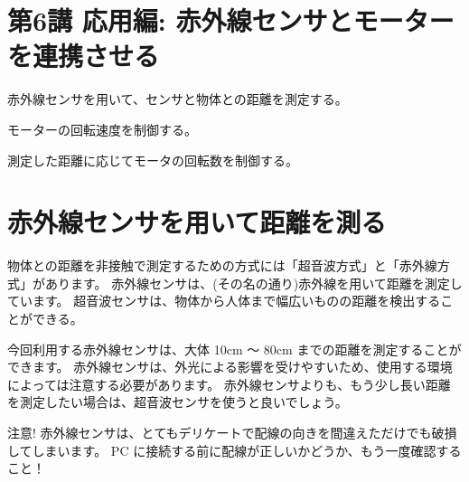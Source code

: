 \documentclass[11pt,a4paper]{jarticle}
\begin{document}
\section*{\LARGE{第6講 応用編: 赤外線センサとモーターを連携させる}}
赤外線センサを用いて、センサと物体との距離を測定する。

モーターの回転速度を制御する。

測定した距離に応じてモータの回転数を制御する。


\section{赤外線センサを用いて距離を測る}
物体との距離を非接触で測定するための方式には「超音波方式」と「赤外線方式」があります。
赤外線センサは、(その名の通り)赤外線を用いて距離を測定しています。
超音波センサは、物体から人体まで幅広いものの距離を検出することができる。

今回利用する赤外線センサは、大体 10cm 〜 80cm までの距離を測定することができます。
赤外線センサは、外光による影響を受けやすいため、使用する環境によっては注意する必要があります。
赤外線センサよりも、もう少し長い距離を測定したい場合は、超音波センサを使うと良いでしょう。


\begin{itembox}[l]{注意!}
 赤外線センサは、とてもデリケートで配線の向きを間違えただけでも破損してしまいます。
 PC に接続する前に配線が正しいかどうか、もう一度確認すること！
\end{itembox}
\end{document}
